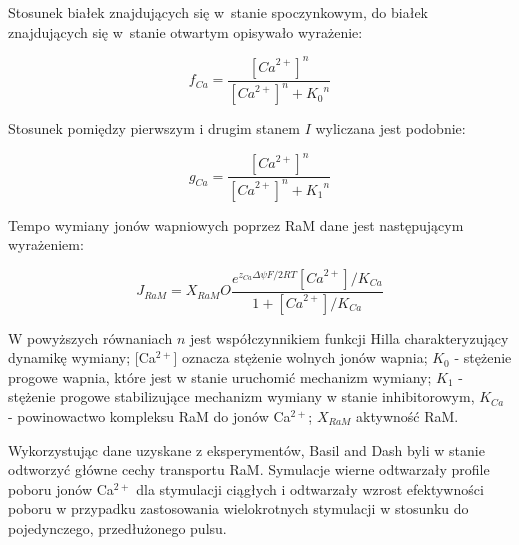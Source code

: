 Stosunek białek znajdujących się w~stanie spoczynkowym, do białek znajdujących się w~stanie otwartym opisywało wyrażenie:


\begin{equation}
{ f }_{ Ca }=\frac { { \left[ { Ca }^{ 2+ } \right]  }^{ n } }{ { \left[ { Ca }^{ 2+ } \right]  }^{ n }+{ { K }_{0} }^{ n } }
\end{equation}

\noindent Stosunek pomiędzy pierwszym i drugim stanem $I$ wyliczana jest podobnie:

\begin{equation}
{ g }_{ Ca }=\frac { { \left[ { Ca }^{ 2+ } \right]  }^{ n } }{ { \left[ { Ca }^{ 2+ } \right]  }^{ n }+{ { K }_{ 1 } }^{ n } }
\end{equation}

\noindent Tempo wymiany jonów wapniowych poprzez RaM dane jest następującym wyrażeniem:

\begin{equation}
{ J }_{ RaM }={ X }_{ RaM }O\frac { { e }^{ { z }_{ Ca }\Delta \psi F/2RT }\left[ { Ca }^{ 2+ } \right] /{ K }_{ Ca } }{ 1+\left[ { Ca }^{ 2+ } \right] /{ K }_{ Ca } }
\end{equation}

\noindent W powyższych równaniach $n$ jest współczynnikiem funkcji Hilla charakteryzujący dynamikę wymiany; [Ca$^{2+}$]  oznacza stężenie wolnych jonów wapnia; $K_0$ - stężenie progowe wapnia, które jest w stanie uruchomić mechanizm wymiany; $K_1$ - stężenie progowe stabilizujące mechanizm wymiany w stanie inhibitorowym, $K_{Ca}$ - powinowactwo kompleksu RaM do jonów Ca$^{2+}$; $X_{RaM}$ aktywność RaM.

%
%
%

Wykorzystując dane uzyskane z eksperymentów, Basil and Dash byli w stanie odtworzyć główne cechy transportu RaM. Symulacje wierne odtwarzały profile poboru jonów Ca$^{2+}$ dla stymulacji ciągłych i odtwarzały wzrost efektywności poboru w przypadku zastosowania wielokrotnych stymulacji w stosunku do pojedynczego, przedłużonego pulsu.

